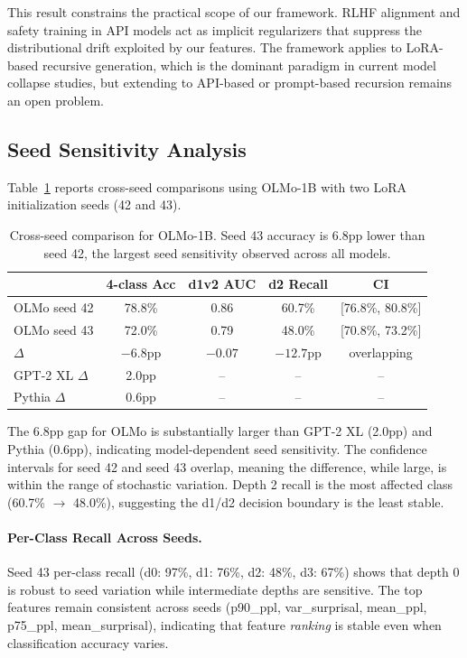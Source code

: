 \documentclass[11pt,a4paper]{article}
\begin{document}
This result constrains the practical scope of our framework. RLHF alignment and safety training in API models act as implicit regularizers that suppress the distributional drift exploited by our features. The framework applies to LoRA-based recursive generation, which is the dominant paradigm in current model collapse studies, but extending to API-based or prompt-based recursion remains an open problem.

\subsection{Seed Sensitivity Analysis}

Table~\ref{tab:seed} reports cross-seed comparisons using OLMo-1B with two LoRA initialization seeds (42 and 43).

\begin{table}[t]
\centering
\caption{Cross-seed comparison for OLMo-1B. Seed 43 accuracy is 6.8pp lower than seed 42, the largest seed sensitivity observed across all models.}
\label{tab:seed}
\small
\begin{tabular}{lcccc}
\toprule
& \textbf{4-class Acc} & \textbf{d1v2 AUC} & \textbf{d2 Recall} & \textbf{CI} \\
\midrule
OLMo seed 42 & 78.8\% & 0.86 & 60.7\% & [76.8\%, 80.8\%] \\
OLMo seed 43 & 72.0\% & 0.79 & 48.0\% & [70.8\%, 73.2\%] \\
$\Delta$ & $-6.8$pp & $-0.07$ & $-12.7$pp & overlapping \\
\midrule
GPT-2 XL $\Delta$ & 2.0pp & -- & -- & -- \\
Pythia $\Delta$ & 0.6pp & -- & -- & -- \\
\bottomrule
\end{tabular}
\end{table}

The 6.8pp gap for OLMo is substantially larger than GPT-2 XL (2.0pp) and Pythia (0.6pp), indicating model-dependent seed sensitivity. The confidence intervals for seed 42 and seed 43 overlap, meaning the difference, while large, is within the range of stochastic variation. Depth 2 recall is the most affected class (60.7\% $\to$ 48.0\%), suggesting the d1/d2 decision boundary is the least stable.

\paragraph{Per-Class Recall Across Seeds.}
Seed 43 per-class recall (d0: 97\%, d1: 76\%, d2: 48\%, d3: 67\%) shows that depth 0 is robust to seed variation while intermediate depths are sensitive. The top features remain consistent across seeds (p90\_ppl, var\_surprisal, mean\_ppl, p75\_ppl, mean\_surprisal), indicating that feature \emph{ranking} is stable even when classification accuracy varies.
\end{document}
